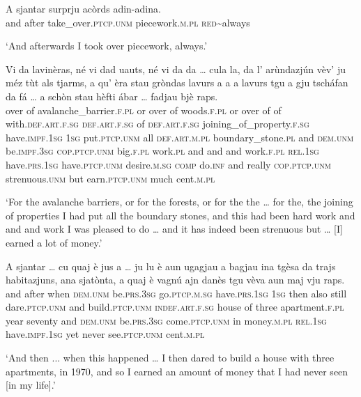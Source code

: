 \begin{linenumbers}
\gll    A sjantar surprju acòrds adin-adina.\\
and after take\_over.\textsc{ptcp.unm} piecework.\textsc{m.pl} \textsc{red}\textasciitilde{always} \\
\end{linenumbers}
\medskip
\glt `And afterwards I took over piecework, always.'

\medskip
\begin{linenumbers}
\gll    Vi da lavinèras, né vi dad uauts, né vi da da … cula la, da l’ arùndazjún vèv’ ju méz tùt als tjarms, a qu’ èra stau gròndas lavurs a a a lavurs tgu a gju tscháfan da fá … a schòn stau hèfti ábar … fadjau bjè raps.\\
over of avalanche\_barrier.\textsc{f.pl} or over of woods.\textsc{f.pl} or over of of {} with.\textsc{def.art.f.sg} \textsc{def.art.f.sg} of \textsc{def.art.f.sg} joining\_of\_property.\textsc{f.sg} have.\textsc{impf.1sg} \textsc{1sg} put.\textsc{ptcp.unm} all  \textsc{def.art.m.pl} boundary\_stone.\textsc{pl} and \textsc{dem.unm} be.\textsc{impf.3sg} \textsc{cop.ptcp.unm} big.\textsc{f.pl} work.\textsc{pl} and and and work.\textsc{f.pl} \textsc{rel.1sg} have.\textsc{prs.1sg} have.\textsc{ptcp.unm} desire.\textsc{m.sg} \textsc{comp} do.\textsc{inf} {} and really \textsc{cop.ptcp.unm} strenuous.\textsc{unm} but {} earn.\textsc{ptcp.unm} much cent.\textsc{m.pl}\\
\end{linenumbers}
\medskip
\glt `For the avalanche barriers, or for the forests, or for the the … for the, the joining of properties I had put all the boundary stones, and this had been  hard work and and and work I was pleased to do … and it has indeed been strenuous but … [I] earned a lot of money.'
\medskip

\begin{linenumbers}
\gll    A sjantar … cu quaj è jus a … ju lu è aun ugagjau a bagjau ina tgèsa da trajs habitazjuns, ana sjatònta, a quaj è vagnú ajn danès tgu vèva aun maj vju raps.\\
and after {} when \textsc{dem.unm} be.\textsc{prs.3sg} go.\textsc{ptcp.m.sg}  have.\textsc{prs.1sg} {} \textsc{1sg} then also still dare.\textsc{ptcp.unm} and build.\textsc{ptcp.unm} \textsc{indef.art.f.sg} house of three apartment.\textsc{f.pl} year seventy and \textsc{dem.unm} be.\textsc{prs.3sg} come.\textsc{ptcp.unm} in money.\textsc{m.pl} \textsc{rel.1sg} have.\textsc{impf.1sg} yet never see.\textsc{ptcp.unm} cent.\textsc{m.pl}\\
\end{linenumbers}
\medskip
\glt `And then ... when this happened … I then dared to build a house with three apartments, in 1970, and so I earned an amount of money that I had never seen [in my life].'
\medskip

